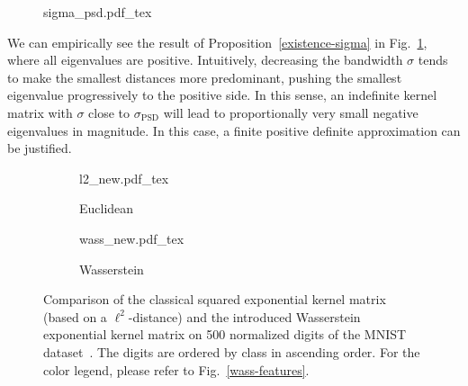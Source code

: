 \begin{figure}
    \centering
    \def\svgwidth{\textwidth}\footnotesize
    {sigma_psd.pdf_tex}
    \caption[]{}
\end{figure}


We can empirically see the result of Proposition~\ref{existence-sigma} in Fig.~\ref{kernels}, where all eigenvalues are positive. Intuitively, decreasing the bandwidth $\sigma$ tends to make the smallest distances more predominant, pushing the smallest eigenvalue progressively to the positive side. In this sense, an indefinite kernel matrix with $\sigma$ close to $\sigma_{\mathrm{PSD}}$ will lead to proportionally very small negative eigenvalues in magnitude. In this case, a finite positive definite approximation can be justified.
\begin{figure}[h!]
    \centering
    \begin{subfigure}[t]{0.45\textwidth}
        \centering \footnotesize
        \def\svgwidth{\linewidth}
        {l2_new.pdf_tex}
        \caption{Euclidean}
    \end{subfigure}%
    \hfill
    \begin{subfigure}[t]{0.45\textwidth}
        \centering \footnotesize
        \def\svgwidth{\linewidth}
        {wass_new.pdf_tex}
        \caption{Wasserstein}
    \end{subfigure}%
    \caption[Spectrum of the RBF and Wasserstein exponential kernels on MNIST.]{Comparison of the classical squared exponential kernel matrix (based on a $\ell^2$-distance) and the introduced Wasserstein exponential kernel matrix on 500 normalized digits of the MNIST dataset~\cite{lecun-mnisthandwrittendigit-2010}. The digits are ordered by class in ascending order. For the color legend, please refer to Fig.~\ref{wass-features}.}
    \label{kernels}
\end{figure}


